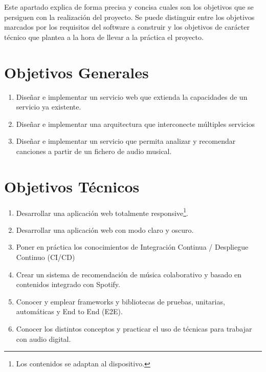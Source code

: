
Este apartado explica de forma precisa y concisa cuales son los objetivos que se persiguen con la realización del proyecto. Se puede distinguir entre los objetivos marcados por los requisitos del software a construir y los objetivos de carácter técnico que plantea a la hora de llevar a la práctica el proyecto.

\section{Objetivos Generales}
\begin{enumerate}
    \item
        Diseñar e implementar un servicio web que extienda la capacidades de un servicio ya existente.
    \item 
        Diseñar e implementar una arquitectura que interconecte múltiples servicios
    \item
        Diseñar e implementar un servicio que permita analizar y recomendar canciones a partir de un fichero de audio musical.
        
    
\end{enumerate}

\section{Objetivos Técnicos}
\begin{enumerate}
    \item 
        Desarrollar una aplicación web totalmente responsive\footnote{Los contenidos se adaptan al dispositivo.}.
    \item
        Desarrollar una aplicación web con modo claro y oscuro.
    \item
        Poner en práctica los conocimientos de Integración Continua / Despliegue Continuo (CI/CD)
    \item
        Crear un sistema de recomendación de música colaborativo y basado en contenidos integrado con Spotify.
    \item
        Conocer y emplear frameworks y bibliotecas de pruebas, unitarias, automáticas y End to End (E2E).
    \item
        Conocer los distintos conceptos y practicar el uso de técnicas para trabajar con audio digital.
\end{enumerate}

